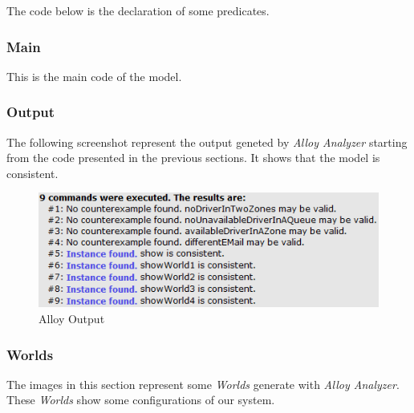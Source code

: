 \documentclass[a4paper]{article}
\begin{document}
The code below is the declaration of some predicates.

\nopagebreak
\begin{minipage}[c]{\codeWidth}

\end{minipage}

\subsubsection{Main}

This is the main code of the model.

\nopagebreak
\begin{minipage}[c]{\codeWidth}

\end{minipage}

\subsubsection{Output}

The following screenshot represent the output geneted by \emph{Alloy Analyzer} starting from the code presented in the previous sections. It shows that the model is consistent.

\nopagebreak
\begin{figure}[H]
\includegraphics[width=.7\textwidth]{Alloy-Output}
\centering
\caption{Alloy Output}
\label{fig:alloyoutput}
\end{figure}

\subsubsection{Worlds}

The images in this section represent some \emph{Worlds} generate with \emph{Alloy Analyzer}. These \emph{Worlds} show some configurations of our system.

\newlength{\worldsWidth}
\setlength{\worldsWidth}{.9\textwidth}
\end{document}
